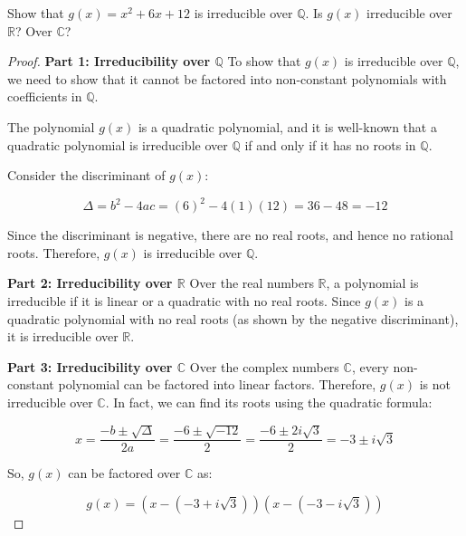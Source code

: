 \documentclass[12pt]{amsart}
\theoremstyle{definition}
\numberwithin{equation}{section}
\theoremstyle{plain}
\renewcommand{\C}{\mathbb{C}}
\newcommand{\R}{\mathbb{R}}
\newcommand{\Q}{\mathbb{Q}}
\begin{document}
\begin{exercise}{15}
    Show that $g(x) = x^2 + 6x + 12$ is irreducible over $\Q$. Is $g (x)$ irreducible over $\R$? Over $\C$?
    
    \begin{proof}
        \textbf{Part 1: Irreducibility over \( \mathbb{Q} \)}
        To show that \( g(x) \) is irreducible over \( \mathbb{Q} \), we need to show that it cannot be factored into non-constant polynomials with coefficients in \( \mathbb{Q} \).
        
        The polynomial \( g(x) \) is a quadratic polynomial, and it is well-known that a quadratic polynomial is irreducible over \( \mathbb{Q} \) if and only if it has no roots in \( \mathbb{Q} \).
        
        Consider the discriminant of \( g(x) \):
        
        \[ \Delta = b^2 - 4ac = (6)^2 - 4(1)(12) = 36 - 48 = -12 \]
        
        Since the discriminant is negative, there are no real roots, and hence no rational roots. Therefore, \( g(x) \) is irreducible over \( \mathbb{Q} \).
        
        \textbf{ Part 2: Irreducibility over \( \mathbb{R} \)}
        Over the real numbers \( \mathbb{R} \), a polynomial is irreducible if it is linear or a quadratic with no real roots. Since \( g(x) \) is a quadratic polynomial with no real roots (as shown by the negative discriminant), it is irreducible over \( \mathbb{R} \).
        
        \textbf{Part 3: Irreducibility over \( \mathbb{C} \)}
        Over the complex numbers \( \mathbb{C} \), every non-constant polynomial can be factored into linear factors. Therefore, \( g(x) \) is not irreducible over \( \mathbb{C} \). In fact, we can find its roots using the quadratic formula:
        
        \[ x = \frac{-b \pm \sqrt{\Delta}}{2a} = \frac{-6 \pm \sqrt{-12}}{2} = \frac{-6 \pm 2i\sqrt{3}}{2} = -3 \pm i\sqrt{3} \]
        
        So, \( g(x) \) can be factored over \( \mathbb{C} \) as:
        
        \[ g(x) = (x - (-3 + i\sqrt{3}))(x - (-3 - i\sqrt{3})) \]
    \end{proof}
\end{exercise}
    
\end{document}
